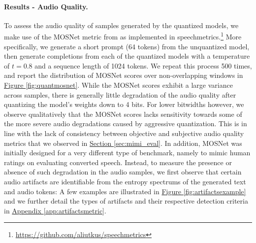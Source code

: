 \paragraph{Results - Audio Quality.} To assess the audio quality of samples generated by the quantized models, we make use of the MOSNet metric from \cite{mosnet} as implemented in speechmetrics.\footnote{\url{https://github.com/aliutkus/speechmetrics}} 
More specifically, we generate a short prompt (64 tokens) from the unquantized model, then generate completions from each of the quantized models with a temperature of $t = 0.8$ and a sequence length of 1024 tokens. We repeat this process 500 times, and  report the distribution of MOSNet scores over non-overlapping windows in \hyperref[fig:quantmosnet]{Figure \ref{fig:quantmosnet}}. While the MOSNet scores exhibit a large variance across samples, there is generally little degradation of the audio quality after quantizing the model's weights down to 4 bits. 
For lower bitwidths however, we observe qualitatively that the MOSNet scores lacks sensitivity towards some of the more severe audio degradations caused by aggressive quantization. This is in line with the lack of consistency between objective and subjective audio quality metrics that we observed  in \hyperref[sec:mimi_eval]{Section \ref{sec:mimi_eval}}.
In addition, MOSNet was initially designed for a very different type of benchmark, namely to mimic human ratings on evaluating converted speech. 
Instead, to measure the presence or absence of such degradation in the audio samples, we first observe that certain audio artifacts are identifiable from the entropy spectrums of the generated text and audio tokens: A few examples are illustrated in \hyperref[fig:artifactsexample]{Figure \ref{fig:artifactsexample}} and we further detail the types of artifacts and their respective detection criteria in \hyperref[app:artifactsmetric]{Appendix \ref{app:artifactsmetric}}.


